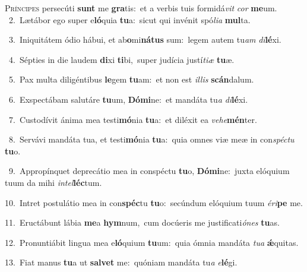 \lettrine{\initial\textcolor{\initialcolor}{P}}{ríncipes} persecúti \textbf{sunt} me \textbf{gra}\-tis:~\star et a verbis tuis formidá\textit{vit} \textit{cor} \textbf{me}\-um.\\
{\numbfont\textcolor{\numbcolor}{~2.}}~Lætábor ego super e\-\textbf{ló}\-quia \textbf{tu}\-a:~\star sicut qui invénit spó\-\textit{li}\-\textit{a} \textbf{mul}\-ta.\par
{\numbfont\textcolor{\numbcolor}{~3.}}~Iniquitátem ódio hábui, et ab\-\textbf{o}\-mi\-\textbf{ná}\-\textbf{tus} sum:~\star legem autem tu\textit{am} \textit{di}\-\textbf{lé}xi.\par
{\numbfont\textcolor{\numbcolor}{~4.}}~Sépties in die laudem \textbf{di}\-xi \textbf{ti}\-bi,~\star super judícia justí\-\textit{ti}\-\textit{æ} \textbf{tu}\-æ.\par
{\numbfont\textcolor{\numbcolor}{~5.}}~Pax multa diligéntibus \textbf{le}\-gem \textbf{tu}\-am:~\star et non est \textit{il}\-\textit{lis} \textbf{scán}\-dalum.\par
{\numbfont\textcolor{\numbcolor}{~6.}}~Exspectábam salutáre \textbf{tu}\-um, \textbf{Dó}\-\textbf{mi}ne:~\star et mandáta tu\textit{a} \textit{di}\-\textbf{lé}xi.\par
{\numbfont\textcolor{\numbcolor}{~7.}}~Custodívit ánima mea testi\-\textbf{mó}\-nia \textbf{tu}\-a:~\star et diléxit ea \textit{ve}\-\textit{he}\textbf{mén}ter.\par
{\numbfont\textcolor{\numbcolor}{~8.}}~Servávi mandáta tua, et testi\-\textbf{mó}\-nia \textbf{tu}\-a:~\star quia omnes viæ meæ in con\-\textit{spéc}\-\textit{tu} \textbf{tu}\-o.\par
{\numbfont\textcolor{\numbcolor}{~9.}}~Appropínquet deprecátio mea in conspéctu \textbf{tu}\-o, \textbf{Dó}\-\textbf{mi}ne:~\star juxta elóquium tuum da mihi \textit{in}\-\textit{tel}\textbf{léc}tum.\par
{\numbfont\textcolor{\numbcolor}{10.}}~Intret postulátio mea in con\-\textbf{spéc}\-tu \textbf{tu}\-o:~\star secúndum elóquium tuum \textit{é}\-\textit{ri}\textbf{pe} me.\par
{\numbfont\textcolor{\numbcolor}{11.}}~Eructábunt lábia \textbf{me}\-a \textbf{hym}\-num,~\star cum docúeris me justificati\-\textit{ó}\-\textit{nes} \textbf{tu}\-as.\par
{\numbfont\textcolor{\numbcolor}{12.}}~Pronuntiábit lingua mea e\-\textbf{ló}\-quium \textbf{tu}\-um:~\star quia ómnia mandáta \textit{tu}\-\textit{a} \textbf{ǽ}\-quitas.\par
{\numbfont\textcolor{\numbcolor}{13.}}~Fiat manus \textbf{tu}\-a ut \textbf{sal}\-\textbf{vet} me:~\star quóniam mandáta tu\textit{a} \textit{e}\-\textbf{lé}gi.\par

